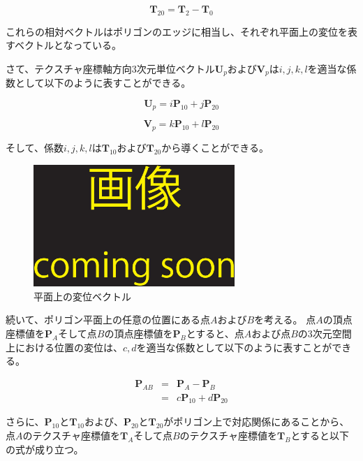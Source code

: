 \begin{equation}
\bm{T}_{20} = \bm{T}_2 - \bm{T}_0
\label{ET20}
\end{equation}

\noindent
これらの相対ベクトルはポリゴンのエッジに相当し、それぞれ平面上の変位を表すベクトルとなっている。

さて、テクスチャ座標軸方向3次元単位ベクトル$\bm{U}_p$および$\bm{V}_p$は$i,j,k,l$を適当な係数として以下のように表すことができる。

\begin{equation}
\bm{U}_p = i\bm{P}_{10} + j\bm{P}_{20}
\label{EUp}
\end{equation}

\begin{equation}
\bm{V}_p = k\bm{P}_{10} + l\bm{P}_{20}
\label{EVp}
\end{equation}

\noindent
そして、係数$i,j,k,l$は$\bm{T}_{10}$および$\bm{T}_{20}$から導くことができる。


\begin{figure}[h]
  \centering
  \includegraphics[width=3.0in]{./img/TEMP}
  \caption{平面上の変位ベクトル}
  \label{FAtoB}
\end{figure}

続いて、ポリゴン平面上の任意の位置にある点$A$および$B$を考える。
点$A$の頂点座標値を$\bm{P}_A$そして点$B$の頂点座標値を$\bm{P}_B$とすると、点$A$および点$B$の3次元空間上における位置の変位は、$c,d$を適当な係数として以下のように表すことができる。

\begin{eqnarray}
\bm{P}_{AB} &=& \bm{P}_A - \bm{P}_B\nonumber\\
           &=& c\bm{P}_{10} +  d\bm{P}_{20}  
\label{EPab}
\end{eqnarray}

\noindent
さらに、$\bm{P}_{10}$と$\bm{T}_{10}$および、$\bm{P}_{20}$と$\bm{T}_{20}$がポリゴン上で対応関係にあることから、点$A$のテクスチャ座標値を$\bm{T}_A$そして点$B$のテクスチャ座標値を$\bm{T}_B$とすると以下の式が成り立つ。

